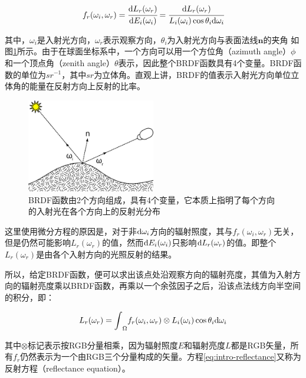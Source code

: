 \begin{equation}\label{eq-intro-brdf}
    f_r(\omega_i,\omega_r)= \cfrac{{\rm d}L_r(\omega_r)}{{\rm d}E_i(\omega_i)}= \cfrac{{\rm d}L_r(\omega_r)}{L_i(\omega_i)\cos\theta_i {\rm d}\omega_i}
\end{equation}

其中，$\omega_i$是入射光方向，$\omega_r$表示观察方向，$\theta_i$为入射光方向与表面法线$\mathbf{n}$的夹角 如图\ref{f:intro-brdf}所示。由于在球面坐标系中，一个方向可以用一个方位角（azimuth angle）$\phi$和一个顶点角（zenith angle）$\theta$表示，因此整个BRDF函数具有4个变量。BRDF函数的单位为$sr^{-1}$，其中$sr$为立体角。直观上讲，BRDF的值表示入射光方向单位立体角的能量在反射方向上反射的比率。

\begin{figure}
\sidecaption
	\includegraphics[width=0.5\textwidth]{figures/intro/BRDF_Diagram}
	\caption{BRDF函数由2个方向组成，具有4个变量，它本质上指明了每个方向的入射光在各个方向上的反射光分布}
	\label{f:intro-brdf}
\end{figure}

这里使用微分方程的原因是，对于非${\rm d}\omega_i$方向的辐射照度，其与$f_r(\omega_i,\omega_r)$无关，但是仍然可能影响$L_r(\omega_r)$的值，然而${\rm d}E_i(\omega_i)$只影响${\rm d}L_r(\omega_r)$的值。即整个$L_r(\omega_r)$是由各个入射方向的光照反射的结果。

所以，给定BRDF函数，便可以求出该点处沿观察方向的辐射亮度，其值为入射方向的辐射亮度乘以BRDF函数，再乘以一个余弦因子之后，沿该点法线方向半空间的积分，即：

\begin{equation}\label{eq:intro-reflectance}
	L_r(\omega_r)={\rm \int}_{\Omega}f_r(\omega_i,\omega_r)\otimes L_i(\omega_i)\cos\theta_i {\rm d}\omega_i
\end{equation}

\noindent 其中$\otimes$标记表示按RGB分量相乘，因为辐射照度$E$和辐射亮度$L$都是RGB矢量，所有$f_r$仍然表示为一个由RGB三个分量构成的矢量。方程\ref{eq:intro-reflectance}又称为反射方程（reflectance equation）。




